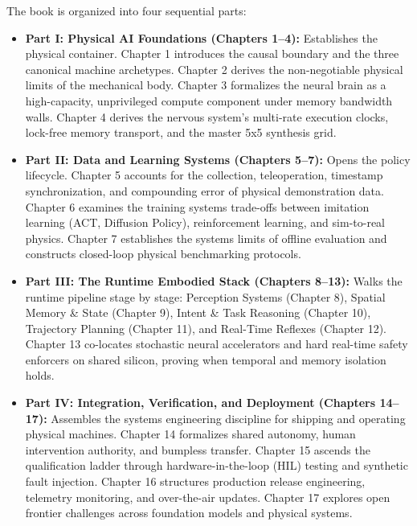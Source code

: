 \documentclass[
  9pt,
  letterpaper,
  open=right,
  numbers=noenddot,
  captions=tableheading]{scrbook}
\providecommand{\tightlist}{%
  \setlength{\itemsep}{0pt}\setlength{\parskip}{0pt}}
\def\tightlist{}
\let\tightlist\relax
\begin{document}

The book is organized into four sequential parts:

\begin{itemize}
\tightlist
\item
  \textbf{Part I: Physical AI Foundations (Chapters 1--4):} Establishes
  the physical container. Chapter 1 introduces the causal boundary and
  the three canonical machine archetypes. Chapter 2 derives the
  non-negotiable physical limits of the mechanical body. Chapter 3
  formalizes the neural brain as a high-capacity, unprivileged compute
  component under memory bandwidth walls. Chapter 4 derives the nervous
  system's multi-rate execution clocks, lock-free memory transport, and
  the master 5x5 synthesis grid.
\item
  \textbf{Part II: Data and Learning Systems (Chapters 5--7):} Opens the
  policy lifecycle. Chapter 5 accounts for the collection,
  teleoperation, timestamp synchronization, and compounding error of
  physical demonstration data. Chapter 6 examines the training systems
  trade-offs between imitation learning (ACT, Diffusion Policy),
  reinforcement learning, and sim-to-real physics. Chapter 7 establishes
  the systems limits of offline evaluation and constructs closed-loop
  physical benchmarking protocols.
\item
  \textbf{Part III: The Runtime Embodied Stack (Chapters 8--13):} Walks
  the runtime pipeline stage by stage: Perception Systems (Chapter 8),
  Spatial Memory \& State (Chapter 9), Intent \& Task Reasoning (Chapter
  10), Trajectory Planning (Chapter 11), and Real-Time Reflexes (Chapter
  12). Chapter 13 co-locates stochastic neural accelerators and hard
  real-time safety enforcers on shared silicon, proving when temporal
  and memory isolation holds.
\item
  \textbf{Part IV: Integration, Verification, and Deployment (Chapters
  14--17):} Assembles the systems engineering discipline for shipping
  and operating physical machines. Chapter 14 formalizes shared
  autonomy, human intervention authority, and bumpless transfer. Chapter
  15 ascends the qualification ladder through hardware-in-the-loop (HIL)
  testing and synthetic fault injection. Chapter 16 structures
  production release engineering, telemetry monitoring, and over-the-air
  updates. Chapter 17 explores open frontier challenges across
  foundation models and physical systems.
\end{itemize}
\end{document}

